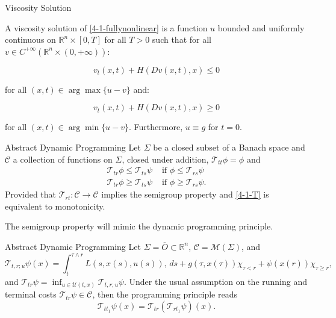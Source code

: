 \documentclass[10pt, compress]{beamer}
\newcommand{\R}{\mathbb{R}}
\begin{document}
\begin{frame}{Viscosity Solution}
    \begin{definition}
    A viscosity solution of \ref{4-1-fullynonlinear} is a function $u$ bounded and uniformly continuous on $\R^n\times[0,T]$ for all $T>0$ such that 
    for all $v\in C^{+\infty}(\R^n\times(0,+\infty))$:

    \[v_t(x,t)+H(Dv(x,t),x)\leq0\]

    for all $(x,t)\in\arg \max\{u-v\}$ and:

    \[v_t(x,t)+H(Dv(x,t),x)\geq0\]

    for all $(x,t)\in\arg \min\{u-v\}$. Furthermore, $u\equiv g$ for $t=0$. 
\end{definition}
\end{frame}

\begin{frame}{Abstract Dynamic Programming}
    Let $\Sigma$ be a closed subset of a Banach space and $\mathcal{C}$ a collection of functions on $\Sigma$, closed under addition, $\mathcal{T}_{tt}\phi = \phi$ and 
    \begin{equation}\label{4-1-T}
        \begin{aligned}
            \mathcal{T}_{tr}\phi\leq\mathcal{T}_{ts}\psi & \text{ if } \phi\leq \mathcal{T}_{rs}\psi\\
            \mathcal{T}_{tr}\phi\geq\mathcal{T}_{ts}\psi & \text{ if } \phi\geq \mathcal{T}_{rs}\psi.
        \end{aligned}
    \end{equation}
    Provided that $\mathcal{T}_{rt}:\mathcal{C}\rightarrow\mathcal{C}$ implies the semigroup property and \ref{4-1-T} is equivalent to monotonicity.

    The semigroup property will mimic the dynamic programming principle.
\end{frame}

\begin{frame}{Abstract Dynamic Programming}
    Let $\Sigma=\overline{O}\subset\mathbb{R}^n$, $\mathcal{C}=\mathcal{M}(\Sigma)$, and
    \begin{equation*}\label{4-1-valuefunctreform}
    \mathcal{T}_{t,r;u}\psi(x) = \int_t^{\tau\wedge r}L(s,x(s),u(s)),\,ds + g(\tau,x(\tau))\chi_{\tau<r} + \psi(x(r))\chi_{\tau\geq r}, 
    \end{equation*}
    and $\mathcal{T}_{tr}\psi = \inf_{u\in\mathcal{U}(t,x)} \mathcal{T}_{t,r;u}\psi.$ Under the usual assumption on the running and terminal costs $\mathcal{T}_{tr}\psi\in\mathcal{C}$, then the programming principle reads
    \[\mathcal{T}_{tt_1}\psi(x)=\mathcal{T}_{tr}\left(\mathcal{T}_{rt_1}\psi\right)(x).\]
\end{frame}
\end{document}
